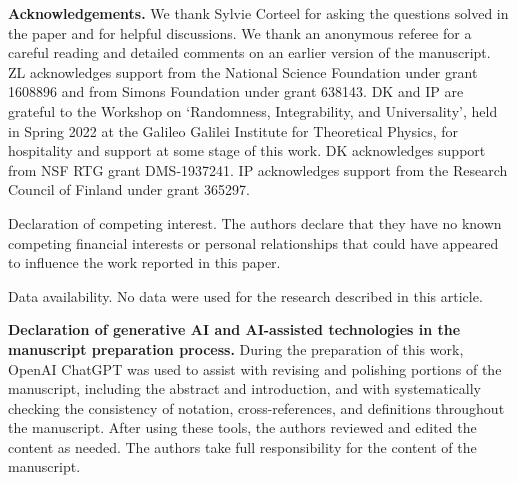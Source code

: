 \documentclass[11pt]{amsart}
\theoremstyle{plain}
\numberwithin{equation}{section}
\numberwithin{theorem}{section}
\numberwithin{figure}{section}
\begin{document}
\bigskip

\bigskip
\noindent\textbf{Acknowledgements.} We thank Sylvie Corteel for asking the questions solved in the paper and for helpful discussions. We thank an anonymous referee for a careful reading and detailed comments on an earlier version of the manuscript. ZL acknowledges support from the National Science Foundation under grant 1608896 and from Simons Foundation under grant 638143. DK and IP are grateful to the Workshop on ‘Randomness, Integrability, and Universality’, held in Spring 2022 at the Galileo Galilei Institute for Theoretical Physics, for hospitality and support at some stage of this work. DK acknowledges support from NSF RTG grant DMS-1937241. IP acknowledges support from the Research Council of Finland under grant 365297.

\medskip
Declaration of competing interest.
The authors declare that they have no known competing
financial interests or personal relationships that could have appeared to
influence the work reported in this paper.

\medskip
Data availability.
No data were used for the research described in this article.

\medskip
\noindent\textbf{Declaration of generative AI and AI-assisted technologies in the manuscript preparation process.}
During the preparation of this work, OpenAI ChatGPT was used to assist with revising and polishing portions of the manuscript, including the abstract and introduction, and with systematically checking the consistency of notation, cross-references, and definitions throughout the manuscript. After using these tools, the authors reviewed and edited the content as needed. The authors take full responsibility for the content of the manuscript.

 


\end{document}
